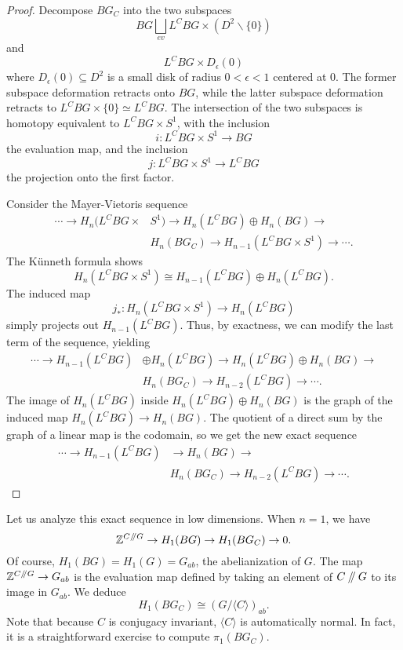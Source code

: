 \documentclass[10pt,twocolumn,amsmath,amssymb,aps,pra,secnumarabic,
    nofootinbib,groupedaddress]{revtex4-1}
\renewcommand{\setminus}{\smallsetminus}
\newcommand{\sslash}{\mathbin{/\mkern-5mu/}}
\begin{document}
\begin{proof}
Decompose $BG_C$ into the two subspaces
\[ BG \bigsqcup_{ev} L^CBG \times (D^2 \setminus \{0\}) \]
and
\[ L^CBG \times D_\epsilon(0) \]
where $D_\epsilon(0) \subseteq D^2$ is a small disk of radius $0 < \epsilon < 1$ centered at $0$.  The former subspace deformation retracts onto $BG$, while the latter subspace deformation retracts to $L^CBG \times \{0\} \simeq L^CBG$.  The intersection of the two subspaces is homotopy equivalent to $L^CBG \times S^1$, with the inclusion
\[ i: L^CBG \times S^1 \to BG \]
the evaluation map, and the inclusion
\[ j: L^CBG \times S^1 \to L^CBG \]
the projection onto the first factor.

Consider the Mayer-Vietoris sequence
\[\begin{aligned}
\cdots \to H_n(L^CBG \times &S^1) \to H_n(L^CBG) \oplus H_n(BG) \to \\
&H_n(BG_C) \to H_{n-1}(L^CBG \times S^1) \to \cdots. \end{aligned}\]
The K\"{u}nneth formula shows
\[ H_n(L^CBG \times S^1) \cong H_{n-1}(L^CBG) \oplus H_n(L^CBG). \]
The induced map
\[ j_*: H_n(L^CBG \times S^1) \to H_n(L^CBG) \]
simply projects out $H_{n-1}(L^CBG)$.  Thus, by exactness, we can modify the last term of the sequence, yielding
\[\begin{aligned}
\cdots \to H_{n-1}(L^CBG) &\oplus H_n(L^CBG) \to H_n(L^CBG) \oplus H_n(BG) \to 
\\ &H_n(BG_C) \to H_{n-2}(L^CBG) \to \cdots. \end{aligned}\]
The image of $H_n(L^CBG)$ inside $H_n(L^CBG) \oplus H_n(BG)$ is the graph of the induced map $H_n(L^CBG) \to H_n(BG)$.  The quotient of a direct sum by the graph of a linear map is the codomain, so we get the new exact sequence
\[\begin{aligned}
\cdots \to H_{n-1}(L^CBG) &\to H_n(BG) \to \\ &H_n(BG_C) \to H_{n-2}(L^CBG) \to \cdots. \end{aligned}\]
\end{proof}

Let us analyze this exact sequence in low dimensions.  When $n=1$, we have
\[ \mathbb{Z}^{C\sslash G} \to H_1(BG) \to H_1(BG_C) \to 0. \]
Of course, $H_1(BG) = H_1(G) = G_{ab}$, the abelianization of $G$.  The map $\mathbb{Z}^{C\sslash G} \to G_{ab}$ is the evaluation map defined by taking an element of $C\sslash G$ to its image in $G_{ab}$.  We deduce
\[ H_1(BG_C) \cong (G/\langle C \rangle)_{ab}. \]
Note that because $C$ is conjugacy invariant, $\langle C \rangle$ is automatically normal.  In fact, it is a straightforward exercise to compute $\pi_1(BG_C)$.
\end{document}
